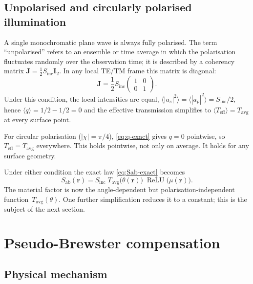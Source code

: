 \documentclass[11pt,a4paper]{article}
\theoremstyle{definition}      %
\newcommand{\rr}{\mathbf{r}}
\newcommand{\Sinc}{S_{\mathrm{inc}}}
\newcommand{\Sab}{S_{\mathrm{ab}}}
\newcommand{\Teff}{T_{\mathrm{eff}}}
\newcommand{\Tavg}{T_{\mathrm{avg}}}
\DeclareMathOperator{\ReLU}{ReLU}
\begin{document}
\subsection{Unpolarised and circularly polarised illumination}
\label{sec:unpol}

A single monochromatic plane wave is always fully polarised.  The term
``unpolarised'' refers to an ensemble or time average in which the
polarisation fluctuates randomly over the observation time; it is
described by a coherency matrix $\mathbf{J} = \frac{1}{2}S_{\mathrm{inc}}\mathbf{I}_2$. In
any local TE/TM frame this matrix is diagonal:
\begin{equation}
  \mathbf{J} = \frac{1}{2}S_{\mathrm{inc}} \begin{pmatrix} 1 & 0 \\ 0 & 1 \end{pmatrix}.
\end{equation}
Under this condition, the local intensities are equal,
$\langle|a_s|^2\rangle=\langle|a_p|^2\rangle=S_{\mathrm{inc}}/2$, hence
$\langle q\rangle=1/2-1/2=0$ and the effective transmission simplifies to
$\langle\Teff\rangle=\Tavg$ at every surface point.

For circular polarisation ($|\chi|=\pi/4$), \cref{eq:q-exact} gives
$q=0$ pointwise, so $\Teff=\Tavg$ everywhere. This holds pointwise, not
only on average. It holds for any surface geometry.

Under either condition the exact law \cref{eq:Sab-exact} becomes
\begin{equation}\label{eq:Sab-Tavg}
  \Sab(\rr) = \Sinc\;\Tavg\!\bigl(\theta(\rr)\bigr)\;
  \ReLU\!\bigl(\mu(\rr)\bigr).
\end{equation}
The material factor is now the angle-dependent but
polarisation-independent function~$\Tavg(\theta)$.  One further
simplification reduces it to a constant; this is the subject of the
next section.


\section{Pseudo-Brewster compensation}\label{sec:pseudo-brewster}

\subsection{Physical mechanism}\label{sec:pB-mechanism}
\end{document}
